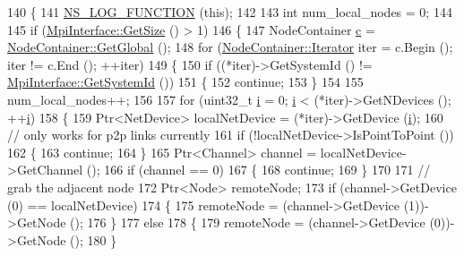 \begin{DoxyCode}
140 \{
141   \hyperlink{log-macros-disabled_8h_a90b90d5bad1f39cb1b64923ea94c0761}{NS\_LOG\_FUNCTION} (\textcolor{keyword}{this});
142 
143   \textcolor{keywordtype}{int} num\_local\_nodes = 0;
144 
145   \textcolor{keywordflow}{if} (\hyperlink{classns3_1_1MpiInterface_ab35c742e7e7ad3fa07cf0dbb92413c82}{MpiInterface::GetSize} () > 1)
146     \{
147       NodeContainer \hyperlink{lte_2model_2fading-traces_2fading__trace__generator_8m_ae0323a9039add2978bf5b49550572c7c}{c} = \hyperlink{classns3_1_1NodeContainer_a687e8f9ceb74d0ce3b06591c9f44c9ed}{NodeContainer::GetGlobal} ();
148       \textcolor{keywordflow}{for} (\hyperlink{classns3_1_1NodeContainer_aa1a9f2d2b09bfef7d066d3974bca2cc4}{NodeContainer::Iterator} iter = c.Begin (); iter != c.End (); ++iter)
149         \{
150           \textcolor{keywordflow}{if} ((*iter)->GetSystemId () != \hyperlink{classns3_1_1MpiInterface_a7f1f671b55948fb1c8f7eb54f22a9619}{MpiInterface::GetSystemId} ())
151             \{
152               \textcolor{keywordflow}{continue};
153             \}
154 
155           num\_local\_nodes++;
156 
157           \textcolor{keywordflow}{for} (uint32\_t \hyperlink{bernuolliDistribution_8m_a6f6ccfcf58b31cb6412107d9d5281426}{i} = 0; \hyperlink{bernuolliDistribution_8m_a6f6ccfcf58b31cb6412107d9d5281426}{i} < (*iter)->GetNDevices (); ++\hyperlink{bernuolliDistribution_8m_a6f6ccfcf58b31cb6412107d9d5281426}{i})
158             \{
159               Ptr<NetDevice> localNetDevice = (*iter)->GetDevice (\hyperlink{bernuolliDistribution_8m_a6f6ccfcf58b31cb6412107d9d5281426}{i});
160               \textcolor{comment}{// only works for p2p links currently}
161               \textcolor{keywordflow}{if} (!localNetDevice->IsPointToPoint ())
162                 \{
163                   \textcolor{keywordflow}{continue};
164                 \}
165               Ptr<Channel> channel = localNetDevice->GetChannel ();
166               \textcolor{keywordflow}{if} (channel == 0)
167                 \{
168                   \textcolor{keywordflow}{continue};
169                 \}
170 
171               \textcolor{comment}{// grab the adjacent node}
172               Ptr<Node> remoteNode;
173               \textcolor{keywordflow}{if} (channel->GetDevice (0) == localNetDevice)
174                 \{
175                   remoteNode = (channel->GetDevice (1))->GetNode ();
176                 \}
177               \textcolor{keywordflow}{else}
178                 \{
179                   remoteNode = (channel->GetDevice (0))->GetNode ();
180                 \}

\end{DoxyCode}
